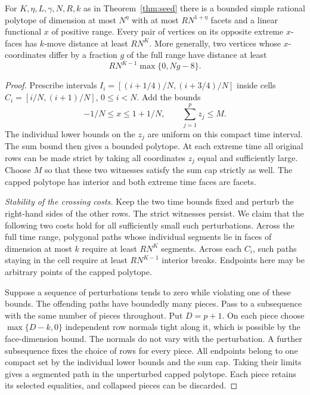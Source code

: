 \begin{lemma}\label{lem:cap}
For \(K,\eta,L,\gamma,N,R,k\) as in Theorem~\ref{thm:seed} there is a bounded simple rational polytope of dimension at most \(N^\eta\) with at most \(R N^{1+\eta}\) facets and a linear functional \(x\) of positive range. Every pair of vertices on its opposite extreme \(x\)-faces has \(k\)-move distance at least \(RN^K\). More generally, two vertices whose \(x\)-coordinates differ by a fraction \(g\) of the full range have distance at least
\[
                         RN^{K-1}\max\{0,Ng-8\}.
\]
\end{lemma}
\begin{proof}
Prescribe intervals \(I_i=[(i+1/4)/N,(i+3/4)/N]\) inside cells \(C_i=[i/N,(i+1)/N]\), \(0\le i<N\). Add the bounds
\[
             -1/N\le x\le1+1/N,\qquad \sum_{j=1}^p z_j\le M .
\]
The individual lower bounds on the \(z_j\) are uniform on this compact
time interval. The sum bound then gives a bounded polytope. At each
extreme time all original rows can be made strict by taking all
coordinates \(z_j\) equal and sufficiently large. Choose \(M\) so that
these two witnesses satisfy the sum cap strictly as well. The capped
polytope has interior and both extreme time faces are facets.

\emph{Stability of the crossing costs.}
Keep the two time bounds fixed and perturb the right-hand sides of the other rows. The strict witnesses persist. We claim that the following two costs hold for all sufficiently small such perturbations. Across the full time range, polygonal paths whose individual segments lie in faces of dimension at most \(k\) require at least \(RN^K\) segments. Across each \(C_i\), such paths staying in the cell require at least \(RN^{K-1}\) interior breaks. Endpoints here may be arbitrary points of the capped polytope.

Suppose a sequence of perturbations tends to zero while violating one
of these bounds. The offending paths have boundedly many pieces.
Pass to a subsequence with the same number of pieces throughout. Put
\(D=p+1\). On each piece choose \(\max\{D-k,0\}\) independent row normals
tight along it, which is possible by the face-dimension bound. The
normals do not vary with the perturbation. A further subsequence fixes
the choice of rows for every piece. All endpoints belong to one compact
set by the individual lower bounds and the sum cap. Taking their limits
gives a segmented path in the unperturbed capped polytope. Each piece
retains its selected equalities, and collapsed pieces can be discarded.


\end{proof}
